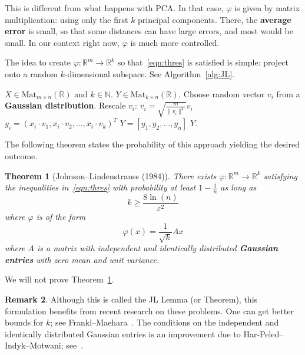 \documentclass[a4paper, 12pt]{article}
\numberwithin{equation}{section}
\numberwithin{figure}{section}
\newtheorem{thm}{Theorem}[section]
\theoremstyle{definition}
\newtheorem{remark}[thm]{Remark}
\renewcommand{\geq}{\geqslant}
\newcommand{\N}{\mathbb{N}}
\newcommand{\R}{\mathbb{R}}
\begin{document}
This is different from what happens with PCA. In that case, $\varphi$ is given
by matrix multiplication: using only the first $k$ principal components. There,
the \textbf{average error} is small, so that some distances can have large
errors, and most would be small. In our context right now, $\varphi$ is much
more controlled.

The idea to create $\varphi: \R^m \to \R^k$ so that~\eqref{eqn:thres} is
satisfied is simple: project onto a random $k$-dimensional subspace. See Algorithm~\ref{alg:JL}.

\begin{algorithm}
	\caption{Random Projection}\label{alg:JL}
	\begin{algorithmic}
		\Require $X \in \text{Mat}_{m \times n}(\R)$ and $k \in \N$.
		\Ensure $Y \in \text{Mat}_{k \times n}(\R)$.
			\State Choose random vector $v_i$ from a \textbf{Gaussian distribution}.
			\State Rescale $v_i$: $v_i = \sqrt{\frac{m}{\lVert v_i \rVert^2}} v_i$
		\EndFor
			\State $y_i = (x_i \cdot v_1, x_i \cdot v_2, \dots, x_i \cdot v_k)^T$
		\EndFor
		\State $Y = [y_1, y_2, \dots, y_n]$
		\State \Return $Y$.
	\end{algorithmic}
\end{algorithm}

The following theorem states the probability of this approach yielding the
desired outcome.

\begin{thm}[Johnson--Lindenstrauss (1984)]\label{thm:JL}
	There exists $\varphi: \R^m \to \R^k$ satisfying the inequalities
	in~\eqref{eqn:thres} with probability at least $1 - \frac{1}{n}$ as long as 
	\[
		k \geq \frac{8 \ln(n)}{\varepsilon^2}
	\]
	where $\varphi$ is of the form 
	\[
		\varphi(x) = \frac{1}{\sqrt{k}} A x
	\]
	where $A$ is a matrix with independent and identically distributed
	\textbf{Gaussian entries} with zero mean and unit variance.
\end{thm}

We will not prove Theorem~\ref{thm:JL}.

\begin{remark}
	Although this is called the JL Lemma (or Theorem), this formulation benefits
	from recent research on these problems. One can get better bounds for $k$;
	see Frankl--Maehara~\cite{FM/90}. The conditions on the independent and
	identically distributed Gaussian entries is an improvement due to
	Har-Peled--Indyk--Motwani; see~\cite{HPIM/12}.
\end{remark}
\end{document}
